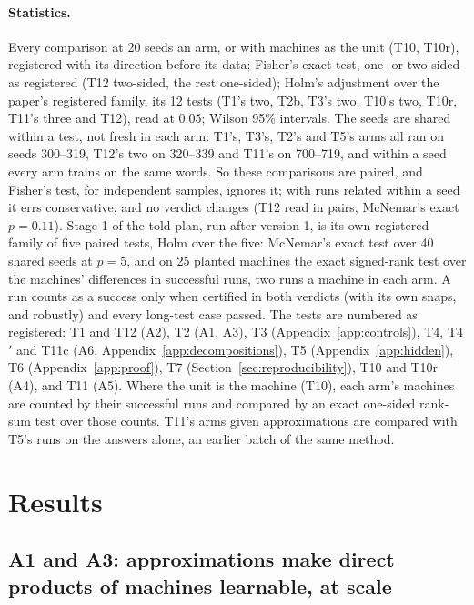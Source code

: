 \documentclass[11pt]{article}
\begin{document}
\paragraph{Statistics.} Every comparison at 20 seeds an arm, or with machines as the unit (T10,
T10r), registered with its direction before its data; Fisher's exact test, one- or two-sided as
registered (T12 two-sided, the rest one-sided); Holm's adjustment over the paper's
registered family, its 12 tests (T1's two, T2b, T3's two, T10's two, T10r, T11's three and T12), read
at 0.05; Wilson 95\% intervals. The seeds are shared within a test, not fresh in each arm: T1's, T3's,
T2's and T5's arms all ran on seeds 300--319, T12's two on 320--339 and T11's on 700--719, and within a
seed every arm trains on the same words. So these comparisons are paired, and Fisher's test, for
independent samples, ignores it; with runs related within a seed it errs conservative, and no verdict
changes (T12 read in pairs, McNemar's exact $p = 0.11$). Stage 1 of the told plan, run after
version 1, is its own registered family of five paired tests, Holm over the five: McNemar's exact
test over 40 shared seeds at $p = 5$, and on 25 planted machines the exact signed-rank test over the
machines' differences in successful runs, two runs a machine in each arm. A run counts as a success only when certified in both verdicts (with its own snaps, and
robustly) and every long-test case passed. The tests are numbered as registered: T1 and T12 (A2), T2
(A1, A3), T3 (Appendix~\ref{app:controls}), T4, T4$'$ and T11c (A6,
Appendix~\ref{app:decompositions}), T5 (Appendix~\ref{app:hidden}), T6 (Appendix~\ref{app:proof}),
T7 (Section~\ref{sec:reproducibility}), T10 and T10r (A4), and T11 (A5). Where the unit is the machine (T10), each arm's machines are counted by their
successful runs and compared by an exact one-sided rank-sum test over those counts. T11's arms
given approximations are compared with T5's runs on the answers alone, an earlier batch of the same
method.

\section{Results}
\label{sec:results}

\subsection{A1 and A3: approximations make direct products of machines learnable, at scale}
\label{sec:a1}
\end{document}
